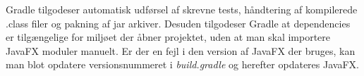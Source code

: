 Gradle tilgodeser automatisk udførsel af skrevne tests, håndtering af kompilerede .class filer og pakning af jar arkiver. Desuden tilgodeser Gradle at dependencies er tilgængelige for miljøet der åbner projektet, uden at man skal importere JavaFX moduler manuelt. Er der en fejl i den version af JavaFX der bruges, kan man blot opdatere versionsnummeret i \emph{build.gradle} og herefter opdateres JavaFX.